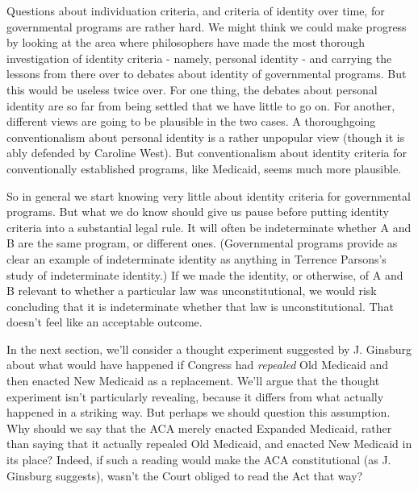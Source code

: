 \documentclass[
  11pt,
  letterpaper,
  DIV=11,
  numbers=noendperiod,
  oneside]{scrartcl}
\begin{document}
Questions about individuation criteria, and criteria of identity over
time, for governmental programs are rather hard. We might think we could
make progress by looking at the area where philosophers have made the
most thorough investigation of identity criteria - namely, personal
identity - and carrying the lessons from there over to debates about
identity of governmental programs. But this would be useless twice over.
For one thing, the debates about personal identity are so far from being
settled that we have little to go on. For another, different views are
going to be plausible in the two cases. A thoroughgoing conventionalism
about personal identity is a rather unpopular view (though it is ably
defended by Caroline West). But conventionalism about identity criteria
for conventionally established programs, like Medicaid, seems much more
plausible.

So in general we start knowing very little about identity criteria for
governmental programs. But what we do know should give us pause before
putting identity criteria into a substantial legal rule. It will often
be indeterminate whether A and B are the same program, or different
ones. (Governmental programs provide as clear an example of
indeterminate identity as anything in Terrence Parsons's study of
indeterminate identity.) If we made the identity, or otherwise, of A and B relevant to
whether a particular law was unconstitutional, we would risk concluding
that it is indeterminate whether that law is unconstitutional. That
doesn't feel like an acceptable outcome.

In the next section, we'll consider a thought experiment suggested by J.
Ginsburg about what would have happened if Congress had \emph{repealed}
Old Medicaid and then enacted New Medicaid as a replacement.
We'll argue that the thought experiment isn't particularly revealing,
because it differs from what actually happened in a striking way. But
perhaps we should question this assumption. Why should we say that the
ACA merely enacted Expanded Medicaid, rather than saying that it
actually repealed Old Medicaid, and enacted New Medicaid in its place?
Indeed, if such a reading would make the ACA constitutional (as J.
Ginsburg suggests), wasn't the Court obliged to read the Act that
way?
\end{document}
